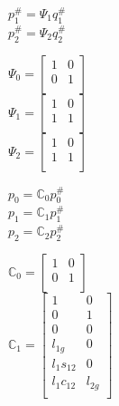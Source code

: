 \documentclass[12pt,a4paper]{article}
\begin{document}
\begin{itemize}
\begin{itemize}
\begin{multicols}{3}
	$ p_1^{\#} = \Psi_1 q_1^{\#} $ \\
	
	$ p_2^{\#} = \Psi_2 q_2^{\#} $ \\
	\end{multicols}
	
	\begin{multicols}{3}
	$ \Psi_0 =
	\begin{bmatrix}
	1 & 0 \\
	0 & 1 \\
	\end{bmatrix}
	$ \\
	
	$ \Psi_1 =
	\begin{bmatrix}
	1 & 0 \\
	1 & 1 \\
	\end{bmatrix}
	$ \\
	
	$ \Psi_2 =
	\begin{bmatrix}
	1 & 0 \\
	1 & 1 \\
	\end{bmatrix}
	$ \\
	\end{multicols}
	
	\begin{multicols}{3}
	$ p_0 = \mathbb{C}_0 p_0^{\#} $ \\
	
	$ p_1 = \mathbb{C}_1 p_1^{\#} $ \\
	
	$ p_2 = \mathbb{C}_2 p_2^{\#} $ \\
	\end{multicols}
	
	\begin{multicols}{3}
	$ \mathbb{C}_0 =
	\begin{bmatrix}
	1 & 0 \\
	0 & 1 \\
	\end{bmatrix}
	$ \\
	
	$ \mathbb{C}_1 =
	\begin{bmatrix}
	1 & 0 \\
	0 & 1 \\
	0 & 0 \\
	l_{1g} & 0\\
	l_1 s_{12} & 0 \\
	l_1 c_{12} & l_{2g} \\
	\end{bmatrix}
	$ \\
	

\end{multicols}
\end{itemize}
\end{itemize}
\end{document}
